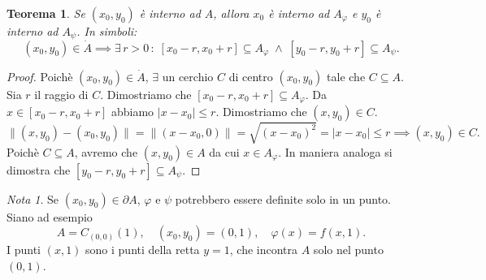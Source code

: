 \documentclass{article}
\theoremstyle{plain}
\newtheorem{thm}{Teorema}[section]
\theoremstyle{definition}
\theoremstyle{remark}
\newtheorem{note}{Nota}
\begin{document}
\vspace{10pt}

\begin{bxthm}
\begin{thm}
    Se $(x_0,y_0)$ è interno ad $A$, allora $x_0$ è interno ad $A_\varphi$ e $y_0$ è interno ad $A_\psi$.
    In simboli:
    \[(x_0,y_0)\in\dot{A}\implies\exists\, r>0\,:\;[x_0-r,x_0+r]\subseteq A_\varphi\;\land\;[y_0-r,y_0+r]\subseteq A_\psi.\]
\end{thm}
\end{bxthm}
\begin{proof}
    Poichè $(x_0,y_0)\in\dot{A}$, $\exists$ un cerchio $C$ di centro $(x_0,y_0)$ tale che $C\subseteq A$. Sia $r$ il raggio di $C$.
    Dimostriamo che $[x_0-r,x_0+r]\subseteq A_\varphi$. 
    Da $x\in [x_0-r,x_0+r]$ abbiamo $|x-x_0|\leq r$.
    Dimostriamo che $(x,y_0)\in C$.
    \[\| (x,y_0)-(x_0,y_0) \|=\| (x-x_0,0) \|=\sqrt{(x-x_0)^2}=|x-x_0|\leq r\implies (x,y_0)\in C.\]
    Poichè $C\subseteq A$, avremo che $(x,y_0)\in A$ da cui $x\in A_\varphi$.
    In maniera analoga si dimostra che $[y_0-r,y_0+r]\subseteq A_\psi$.
\end{proof}

\vspace{10pt}

\begin{note}
    Se $(x_0,y_0)\in \partial A$, $\varphi$ e $\psi$ potrebbero essere definite solo in un punto.
    Siano ad esempio
    \[A=C_{(0,0)}(1),\quad (x_0,y_0)=(0,1),\quad \varphi(x)=f(x,1).\]
    I punti $(x,1)$ sono i punti della retta $y=1$, che incontra $A$ solo nel punto $(0,1)$.
\end{note}

\vspace{10pt}
\end{document}
